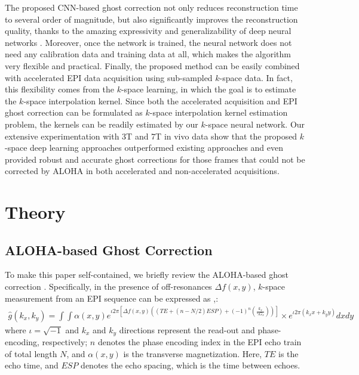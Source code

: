 \documentclass[num-refs]{wiley-article}
\newcommand{\0}{{\boldsymbol{0}}}
\newcommand{\1}{\blmath{1}}
\begin{document}
	The proposed CNN-based ghost correction not only reduces reconstruction time to several order of magnitude, but also significantly improves the reconstruction quality, thanks to the amazing expressivity and generalizability of deep neural networks \cite{ye2019understanding}. Moreover, once the network is trained, the neural network does not need any calibration data and training data at all, which makes the algorithm very flexible and practical. Finally, the proposed method can be easily combined with accelerated EPI data acquisition using sub-sampled $k$-space data. In fact, this flexibility comes from the $k$-space learning, in which the goal is to estimate the $k$-space interpolation kernel. Since both the accelerated acquisition and EPI ghost correction can be formulated as $k$-space interpolation kernel estimation problem, the kernels can be readily estimated by our $k$-space neural network. Our extensive experimentation with 3T and 7T in vivo data show that the proposed $k$-space deep learning approaches outperformed existing approaches and even provided robust and accurate ghost corrections for those frames that could not be corrected by ALOHA in both accelerated and non-accelerated acquisitions.
	
	
	
	\section{Theory}
	\subsection{ALOHA-based Ghost Correction}
	
	To make this paper self-contained, we briefly review the ALOHA-based ghost correction \cite{Lee2016reference}.
	Specifically, in the presence of off-resonances $\Delta f(x,y)$, 
	$k$-space measurement from an EPI sequence can be expressed as \cite{hu1996artifact},\cite{poser2013single}:
	\begin{gather}\label{eq:epi}
	\widehat g(k_x,k_y)=
	\int\int \alpha(x,y)e^{\iota 2\pi \left[ \Delta f(x,y) \left( \left( TE+ (n-N/2)ESP \right) + (-1)^n\left( \frac{k_x}{\gamma G_x} \right) \right) \right]}\times e^{\iota 2\pi (k_x x+k_y y)} dxdy
	\end{gather}
	where  $\iota = \sqrt{-1}$ and $k_x$ and $k_y$ directions represent the read-out and phase-encoding, respectively;
	$n$ denotes the phase encoding index  in the EPI echo train of total length $N$, and
	$\alpha(x,y)$ is the transverse magnetization.
	Here, $TE$ is the echo time, and $ESP$ denotes the echo spacing, which is the time between echoes.
	
\end{document}
